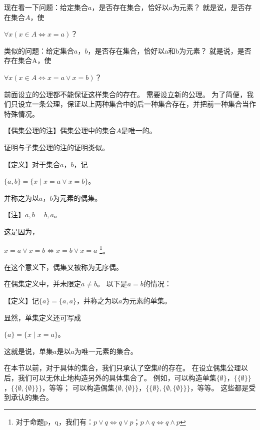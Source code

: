 现在看一下问题：给定集合$a$，是否存在集合，恰好以$a$为元素？
就是说，是否存在集合$A$，使
\begin{center}
$\forall x (x \in A \Leftrightarrow x=a)$？
\end{center}
类似的问题：给定集合$a$，$b$，是否存在集合，恰好以a和b为元素？
就是说，是否存在集合A，使
\begin{center}
$\forall x (x \in A \Leftrightarrow x=a \lor x=b)$？
\end{center}
前面设立的公理都不能保证这样集合的存在。
需要设立新的公理。
为了简便，我们只设立一条公理，保证以上两种集合中的后一种集合存在，并把前一种集合当作特殊情况。


【偶集公理的注】偶集公理中的集合$A$是唯一的。

证明与子集公理的注的证明类似。

【定义】对于集合$a$，$b$，记
\begin{center}
$\{a,b\}=\{x \mid x=a \lor x=b\}$。
\end{center}
并称之为以$a$，$b$为元素的偶集。

【注】${a,b}={b,a}$。

这是因为，
\begin{center}
$x=a \lor x=b \Leftrightarrow x=b \lor x=a$
\footnote{对于命题p，q，我们有：$p \lor q \Leftrightarrow q \lor p$；$p \land q \Leftrightarrow q \land p$}。
\end{center}
在这个意义下，偶集又被称为无序偶。

在偶集定义中，并未限定$a \neq b$。
以下是$a=b$的情况：

【定义】记$\{a\}=\{a,a\}$，并称之为以$a$为元素的单集。

显然，单集定义还可写成
\begin{center}
$\{a\}=\{x \mid x=a\}$。
\end{center}
这就是说，单集${a}$是以$a$为唯一元素的集合。

在本节以前，对于具体的集合，我们只承认了空集$\emptyset$的存在。
在设立偶集公理以后，我们可以无休止地构造另外的具体集合了。
例如，可以构造单集$\{\emptyset\}$，$\{\{\emptyset\}\}$，$\{\{\emptyset, \{\emptyset\}\}\}$，等等；
可以构造偶集$\{\emptyset, \{\emptyset\}\}$，$\{\{\emptyset\},\{\emptyset, \{\emptyset\}\}\}$，等等。
这些都是受到承认的集合。

